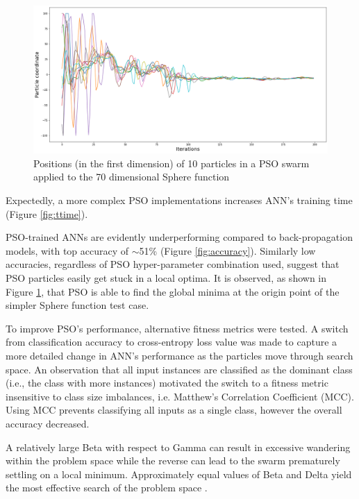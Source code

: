 \documentclass[12pt]{article}
\begin{document}
\begin{figure}[H]
  \centering
  \includegraphics[width=1\textwidth]{figs/sphere_pso.png}
  \caption{Positions (in the first dimension) of 10 particles in a PSO swarm applied to the 70 dimensional Sphere function}
  \label{fig:sphere}
\end{figure}

Expectedly, a more complex PSO implementations increases ANN's training time (Figure \ref{fig:ttime}).

PSO-trained ANNs are evidently underperforming compared to back-propagation models, with top accuracy of $\sim$51\% (Figure \ref{fig:accuracy}). Similarly low accuracies, regardless of PSO hyper-parameter combination used, suggest that PSO particles easily get stuck in a local optima. It is observed, as shown in Figure \ref{fig:sphere}, that PSO is able to find the global minima at the origin point of the simpler Sphere function test case.

To improve PSO's performance, alternative fitness metrics were tested. A switch from classification accuracy to cross-entropy loss value was made to capture a more detailed change in ANN's performance as the particles move through search space.  An observation that all input instances are classified as the dominant class (i.e., the class with more instances) motivated the switch to a fitness metric insensitive to class size  imbalances, i.e. Matthew's Correlation Coefficient (MCC). Using MCC prevents classifying all inputs as a single class, however the overall accuracy decreased.


A relatively large Beta with respect to Gamma can result in excessive wandering within the problem space while the reverse  can lead to the swarm prematurely settling on a local minimum. Approximately equal values of Beta and Delta yield the most effective search of the problem space \cite{Kennedy}.
\end{document}
